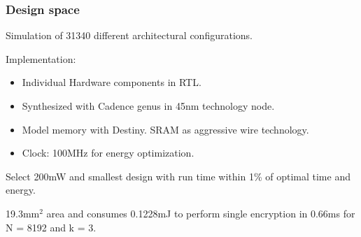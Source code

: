 \documentclass[10pt]{beamer}
\begin{document}


\begin{frame}
\frametitle{Design space}
Simulation of 31340 different architectural configurations.

Implementation:
\pause
\begin{itemize}
    \item Individual Hardware components in RTL.
    \item Synthesized with Cadence genus in 45nm technology node.
\pause
    \item Model memory with Destiny. SRAM as aggressive wire technology.
    \item Clock: 100MHz for energy optimization.
\end{itemize}


\pause
Select 200mW and smallest design with run time within 1\% of optimal time and energy.

19.3mm$^2$ area and consumes 0.1228mJ to perform single encryption in 0.66ms for N = 8192 and k = 3.
\end{frame}






\end{document}
